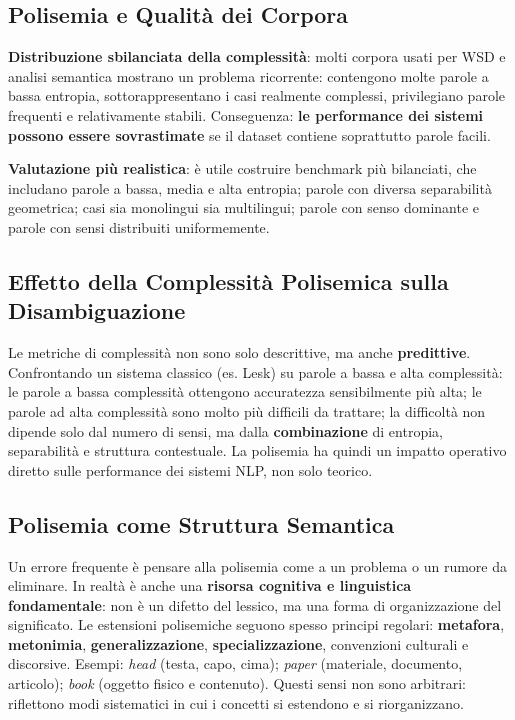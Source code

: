 \documentclass[12pt,a4paper]{article}
\begin{document}
\subsection{Polisemia e Qualit\`a dei Corpora}

\begin{quizbox}
\textbf{Distribuzione sbilanciata della complessit\`a}: molti corpora usati per WSD e analisi semantica mostrano un problema ricorrente: contengono molte parole a bassa entropia, sottorappresentano i casi realmente complessi, privilegiano parole frequenti e relativamente stabili. Conseguenza: \textbf{le performance dei sistemi possono essere sovrastimate} se il dataset contiene soprattutto parole facili.
\end{quizbox}

\textbf{Valutazione pi\`u realistica}: \`e utile costruire benchmark pi\`u bilanciati, che includano parole a bassa, media e alta entropia; parole con diversa separabilit\`a geometrica; casi sia monolingui sia multilingui; parole con senso dominante e parole con sensi distribuiti uniformemente.

\subsection{Effetto della Complessit\`a Polisemica sulla Disambiguazione}

Le metriche di complessit\`a non sono solo descrittive, ma anche \textbf{predittive}. Confrontando un sistema classico (es. Lesk) su parole a bassa e alta complessit\`a: le parole a bassa complessit\`a ottengono accuratezza sensibilmente pi\`u alta; le parole ad alta complessit\`a sono molto pi\`u difficili da trattare; la difficolt\`a non dipende solo dal numero di sensi, ma dalla \textbf{combinazione} di entropia, separabilit\`a e struttura contestuale. La polisemia ha quindi un impatto operativo diretto sulle performance dei sistemi NLP, non solo teorico.

\subsection{Polisemia come Struttura Semantica}

\begin{defbox}
Un errore frequente \`e pensare alla polisemia come a un problema o un rumore da eliminare. In realt\`a \`e anche una \textbf{risorsa cognitiva e linguistica fondamentale}: non \`e un difetto del lessico, ma una forma di organizzazione del significato. Le estensioni polisemiche seguono spesso principi regolari: \textbf{metafora}, \textbf{metonimia}, \textbf{generalizzazione}, \textbf{specializzazione}, convenzioni culturali e discorsive. Esempi: \textit{head} (testa, capo, cima); \textit{paper} (materiale, documento, articolo); \textit{book} (oggetto fisico e contenuto). Questi sensi non sono arbitrari: riflettono modi sistematici in cui i concetti si estendono e si riorganizzano.
\end{defbox}
\end{document}
